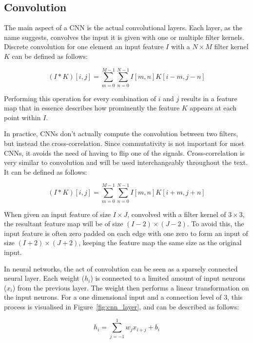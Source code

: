 \subsection{Convolution}

The main aspect of a CNN is the actual convolutional layers. 
Each layer, as the name suggests, convolves the input it is given with one or multiple filter kernels.
Discrete convolution for one element an input feature $I$ with a $N \times M$ filter kernel $K$ can be defined as follows:

\begin{equation}
    (I \ast K)[i, j] = \displaystyle\sum_{m=0}^{M-1}\displaystyle\sum_{n=0}^{N-1}I[m,n] K[i-m, j-n]
\end{equation}

Performing this operation for every combination of $i$ and $j$ results in a feature map that in essence describes how prominently the feature $K$ appears at each point within $I$.

In practice, CNNs don't actually compute the convolution between two filters, but instead the cross-correlation. 
Since commutativity is not important for most CNNs, it avoids the need of having to flip one of the signals. 
Cross-correlation is very similar to convolution and will be used interchangeably throughout the text.
It can be defined as follows:

\begin{equation}
    (I \ast K)[i, j] = \displaystyle\sum_{m=0}^{M-1}\displaystyle\sum_{n=0}^{N-1}I[m,n] K[i+m, j+n]
\end{equation}

When given an input feature of size $I \times J$, convolved with a filter kernel of $3\times3$, the resultant feature map will be of size $(I-2)\times(J-2)$.
To avoid this, the input feature is often zero padded on each edge with one zero to form an input of size $(I+2)\times(J+2)$, keeping the feature map the same size as the original input.

In neural networks, the act of convolution can be seen as a sparsely connected neural layer. 
Each weight ($h_i$) is connected to a limited amount of input neurons ($x_i$) from the previous layer.
The weight then performs a linear transformation on the input neurons. 
For a one dimensional input and a connection level of 3, this process is visualised in Figure~\ref{fig:cnn_layer}, and can be described as follows:

\begin{equation}
    h_i = \displaystyle\sum_{j=-1}^{1}w_{j}x_{i+j}+b_i
\end{equation}

